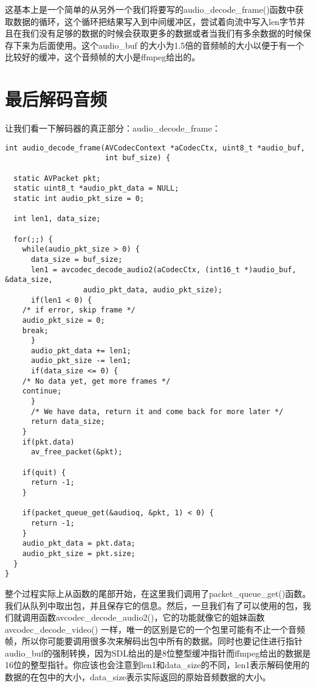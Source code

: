 这基本上是一个简单的从另外一个我们将要写的audio_decode_frame()函数中获取数据的循环，这个循环把结果写入到中间缓冲区，尝试着向流中写入len字节并且在我们没有足够的数据的时候会获取更多的数据或者当我们有多余数据的时候保存下来为后面使用。这个audio_buf 的大小为1.5倍的音频帧的大小以便于有一个比较好的缓冲，这个音频帧的大小是ffmpeg给出的。

\section{最后解码音频}
让我们看一下解码器的真正部分：audio_decode_frame：
\begin{lstlisting}
int audio_decode_frame(AVCodecContext *aCodecCtx, uint8_t *audio_buf,
                       int buf_size) {

  static AVPacket pkt;
  static uint8_t *audio_pkt_data = NULL;
  static int audio_pkt_size = 0;

  int len1, data_size;

  for(;;) {
    while(audio_pkt_size > 0) {
      data_size = buf_size;
      len1 = avcodec_decode_audio2(aCodecCtx, (int16_t *)audio_buf, &data_size,
                  audio_pkt_data, audio_pkt_size);
      if(len1 < 0) {
    /* if error, skip frame */
    audio_pkt_size = 0;
    break;
      }
      audio_pkt_data += len1;
      audio_pkt_size -= len1;
      if(data_size <= 0) {
    /* No data yet, get more frames */
    continue;
      }
      /* We have data, return it and come back for more later */
      return data_size;
    }
    if(pkt.data)
      av_free_packet(&pkt);

    if(quit) {
      return -1;
    }

    if(packet_queue_get(&audioq, &pkt, 1) < 0) {
      return -1;
    }
    audio_pkt_data = pkt.data;
    audio_pkt_size = pkt.size;
  }
}
\end{lstlisting}

整个过程实际上从函数的尾部开始，在这里我们调用了packet_queue_get()函数。我们从队列中取出包，并且保存它的信息。然后，一旦我们有了可以使用的包，我们就调用函数avcodec_decode_audio2()，它的功能就像它的姐妹函数avcodec_decode_video() 一样，唯一的区别是它的一个包里可能有不止一个音频帧，所以你可能要调用很多次来解码出包中所有的数据。同时也要记住进行指针audio_buf的强制转换，因为SDL给出的是8位整型缓冲指针而ffmpeg给出的数据是16位的整型指针。你应该也会注意到len1和data_size的不同，len1表示解码使用的数据的在包中的大小，data_size表示实际返回的原始音频数据的大小。



